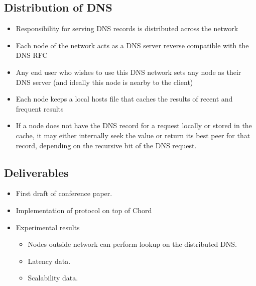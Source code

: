 \documentclass{IEEEtran}
\begin{document}
\subsection{Distribution of DNS}

\begin{itemize}
\item
  Responsibility for serving DNS records is distributed across the
  network
\item
  Each node of the network acts as a DNS server reverse compatible with
  the DNS RFC
\item
  Any end user who wishes to use this DNS network sets any node as their
  DNS server (and ideally this node is nearby to the client)
\item
  Each node keeps a local hosts file that caches the results of recent
  and frequent results
\item
  If a node does not have the DNS record for a request locally or stored
  in the cache, it may either internally seek the value or return its
  best peer for that record, depending on the recursive bit of the DNS
  request.
\end{itemize}

\subsection{Deliverables}
\begin{itemize}

\item{First draft of conference paper.}
\item{Implementation of protocol on top of Chord}
\item{Experimental results}
\begin{itemize}
\item{ Nodes outside network can perform lookup on the distributed DNS.}
\item{ Latency data.}
\item{Scalability data.}
\end{itemize}
\end{itemize}
\end{document}

